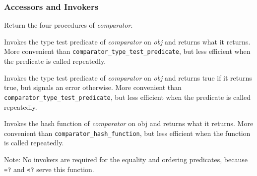 \hypertarget{Accessorsandinvokers}{\subsubsection{Accessors and
Invokers}}

\begin{entry}{%
  }

  Return the four procedures of \emph{comparator}.
\end{entry}

\begin{entry}{%
  }

  Invokes the type test predicate of \emph{comparator} on \emph{obj}
  and returns what it returns. More convenient than
  \texttt{comparator_type_test_predicate}, but less efficient when the
  predicate is called repeatedly.
\end{entry}

\begin{entry}{%
  }

  Invokes the type test predicate of \emph{comparator} on \emph{obj}
  and returns true if it returns true, but signals an error
  otherwise. More convenient than
  \texttt{comparator_type_test_predicate}, but less efficient when the
  predicate is called repeatedly.

\end{entry}

\begin{entry}{%
  }

  Invokes the hash function of \emph{comparator} on obj and returns
  what it returns. More convenient than
  \texttt{comparator_hash_function}, but less efficient when the
  function is called repeatedly.

  Note: No invokers are required for the equality and ordering
  predicates, because \texttt{=?} and \texttt{<?} serve this function.
\end{entry}

